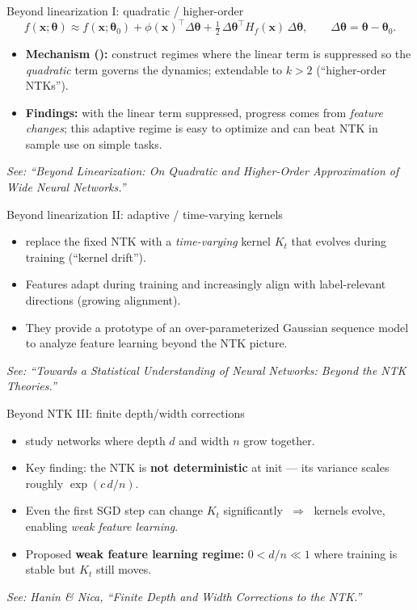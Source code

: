 \documentclass[10pt,aspectratio=169]{beamer}
\newcommand{\btheta}{\boldsymbol{\theta}}
\newcommand{\bx}{\boldsymbol{x}}
\begin{document}
\begin{frame}{Beyond linearization I: quadratic / higher-order}
	\[
		f(\bx;\btheta) \approx f(\bx;\btheta_0)
		+ \phi(\bx)^{\top}\Delta\btheta
		+ \tfrac12\,\Delta\btheta^{\top} H_f(\bx)\,\Delta\btheta,
		\qquad \Delta\btheta=\btheta-\btheta_0.
	\]
	\begin{itemize}
		\item \textbf{Mechanism (\citet{bai2020beyond}):} construct regimes where the linear term is suppressed so the \emph{quadratic} term governs the dynamics; extendable to $k\!>\!2$ (“higher-order NTKs”).
		\item \textbf{Findings:} with the linear term suppressed, progress
		      comes from \emph{feature changes}; this adaptive
		      regime is easy to optimize and can beat NTK in sample use on simple
		      tasks.
	\end{itemize}
	\vspace{0.3em}
	\footnotesize\emph{See: “Beyond Linearization: On Quadratic and Higher-Order Approximation of Wide Neural Networks.”}\normalsize
\end{frame}

\begin{frame}{Beyond linearization II: adaptive / time-varying kernels}
	\begin{itemize}
		\item \citet{zhang2024beyondntk} replace the fixed NTK with a \emph{time-varying} kernel $K_t$ that evolves during training (“kernel drift”).
		\item Features adapt during training and increasingly align with label-relevant directions (growing alignment).
		\item They provide a prototype of an over-parameterized Gaussian sequence model to analyze feature learning beyond the NTK picture.
	\end{itemize}
	\vspace{0.3em}
	\footnotesize\emph{See: “Towards a Statistical Understanding of Neural Networks: Beyond the NTK Theories.”}\normalsize
\end{frame}

\begin{frame}{Beyond NTK III: finite depth/width corrections}
	\begin{itemize}
		\item \citet{haninNica2019finite} study networks where depth $d$ and width $n$ grow together.
		\item Key finding: the NTK is \textbf{not deterministic} at init — its variance scales
		      roughly $\exp(c\,d/n)$.
		\item Even the first SGD step can change $K_t$ significantly $\;\Rightarrow\;$ kernels evolve, enabling
		      \emph{weak feature learning}.
		\item Proposed \textbf{weak feature learning regime:} $0<d/n\ll 1$ where training is stable but $K_t$ still moves.
	\end{itemize}
	\vspace{0.3em}
	\footnotesize\emph{See: Hanin \& Nica, “Finite Depth and Width Corrections to the NTK.”}\normalsize
\end{frame}
\end{document}
